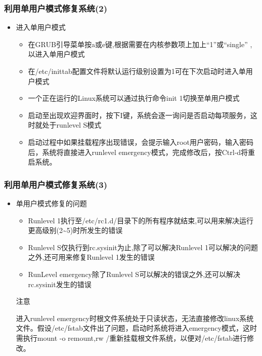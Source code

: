 \documentclass[xcolor=svgnames,presentation]{beamer}
\begin{document}
\begin{frame}
\frametitle{利用单用户模式修复系统(2)}
\label{sec-1-10}
\begin{itemize}

\item 进入单用户模式
\label{sec-1-10-1}%
\begin{itemize}

\item 在GRUB引导菜单按a或e键,根据需要在内核参数项上加上“1”或“single” ,以进入单用户模式
\label{sec-1-10-1-1}%

\item 在/etc/inittab配置文件将默认运行级别设置为1可在下次启动时进入单用户模式
\label{sec-1-10-1-2}%

\item 一个正在运行的Linux系统可以通过执行命令init 1切换至单用户模式
\label{sec-1-10-1-3}%

\item 启动至出现欢迎界面时，按下I键，系统会逐一询问是否启动每项服务，这时就处于runlevel S模式
\label{sec-1-10-1-4}%

\item 启动过程中如果挂载程序出现错误，会提示输入root用户密码，输入密码后，系统将直接进入runlevel emergency模式，完成修改后，按Ctrl-d将重启系统。
\label{sec-1-10-1-5}%
\end{itemize} %
\end{itemize} %
\end{frame}
\begin{frame}
\frametitle{利用单用户模式修复系统(3)}
\label{sec-1-11}
\begin{itemize}

\item 单用户模式修复的问题
\label{sec-1-11-1}%
\begin{itemize}

\item Runlevel 1执行至/etc/rc1.d/目录下的所有程序就结束,可以用来解决运行更高级别(2\~{}5)时所发生的错误
\label{sec-1-11-1-1}%

\item Runlevel S仅执行到rc.sysinit为止,除了可以解决Runlevel 1可以解决的问题之外,还可用来修复Runlevel 1发生的错误
\label{sec-1-11-1-2}%

\item RunLevel emergency除了Runlevel S可以解决的错误之外,还可以解决rc.sysinit发生的错误
\label{sec-1-11-1-3}%
\end{itemize} %
\begin{block}{注意}
\label{sec-1-11-1-4}

进入runlevel emergency时根文件系统处于只读状态，无法直接修改linux系统文件。假设/etc/fstab文件出了问题，启动时系统将进入emergency模式，这时需执行mount -o remount,rw /重新挂载根文件系统，以便对/etc/fstab进行修改。
\end{block}
\end{itemize} %
\end{frame}
\end{document}
